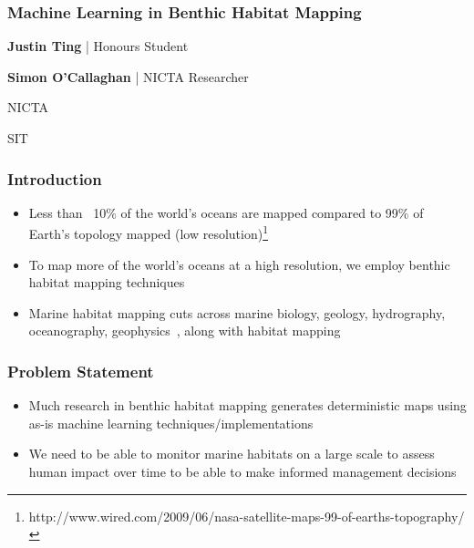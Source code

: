 \documentclass{beamer}
\begin{document}
\begin{frame}
    \frametitle{Machine Learning in Benthic Habitat Mapping}
    \textbf{Justin Ting} | Honours Student

    \textbf{Simon O'Callaghan} | NICTA Researcher

    NICTA

    SIT

\end{frame}

\begin{frame}
    \frametitle{Introduction}
    \begin{itemize}
        \item Less than ~10\% of the world's oceans are mapped compared to 99\% of Earth's topology mapped (low resolution)\footnote{http://www.wired.com/2009/06/nasa-satellite-maps-99-of-earths-topography/}
        \item To map more of the world's oceans at a high resolution, we employ benthic habitat mapping techniques
        \item Marine habitat mapping cuts across marine biology, geology, hydrography, oceanography, geophysics~\citep{cjbrown11}, along with habitat mapping
    \end{itemize}
\end{frame}

\begin{frame}
    \frametitle{Problem Statement}
    \begin{itemize}
        \item Much research in benthic habitat mapping generates deterministic maps using as-is machine learning techniques/implementations
        \item We need to be able to monitor marine habitats on a large scale to assess human impact over time to be able to make informed management decisions
    \end{itemize}
\end{frame}
\end{document}
